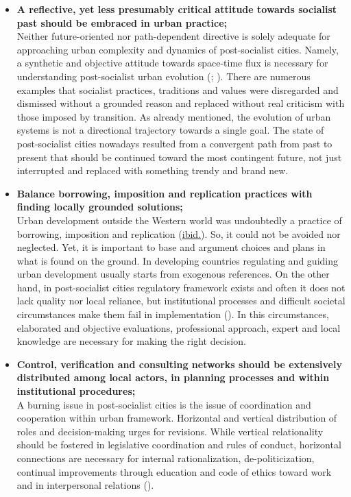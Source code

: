 \documentclass[11pt]{report}
\begin{document}
{\begin{itemize}
\item \textbf{A reflective, yet less presumably critical attitude towards socialist past should be embraced in urban practice;}
\\
Neither future-oriented nor path-dependent directive is solely adequate for approaching urban complexity and dynamics of  post-socialist cities. Namely, a synthetic and objective attitude towards space-time flux is necessary for understanding post-socialist urban evolution (\href{Thomas}{\citealt{thomas_thinking_1998}}; \href{Nedovic}{\citealt{nedovicbudic_waves_2006}}).
There are numerous examples that socialist practices, traditions and values were disregarded and dismissed without a grounded reason and replaced without real criticism with those imposed by transition.
As already mentioned, the evolution of urban systems is not a directional trajectory towards a single goal.
The state of post-socialist cities nowadays resulted from a convergent path from past to present that should be continued toward the most contingent future, not just interrupted and replaced with something trendy and brand  new.

\item \textbf{Balance borrowing, imposition and replication practices with finding locally grounded solutions;}
\\
Urban development outside the Western world was undoubtedly a practice of borrowing, imposition and replication (\href{Nedovic}{ibid.}). So, it could not be avoided nor neglected.
Yet, it is important to base and argument choices and plans in what is found on the ground.
In developing countries regulating and guiding urban development usually starts from exogenous references.
On the other hand,  in post-socialist cities regulatory framework exists and often it does not lack quality nor local reliance, but institutional processes and difficult societal circumstances make them fail in implementation (\href{Nedovic}{\citealt{nedovic-budic_mornings_2011}}). In this circumstances, elaborated and objective evaluations, professional approach, expert and local knowledge are necessary for making the right decision.

\item \textbf{Control, verification and consulting networks should be extensively distributed among local actors, in planning processes and within institutional procedures;}
\\
A burning issue in post-socialist cities is the issue of coordination and cooperation within urban framework.
Horizontal and vertical distribution of roles and decision-making urges for revisions.
While vertical relationality should be fostered in legislative coordination and rules of conduct, horizontal connections are necessary for internal rationalization, de-politicization, continual improvements through education and code of ethics toward work and in interpersonal relations (\href{Vujosevic}{\citealt{vujosevic_regionalizam_2015}}).
     

\end{itemize}}
\end{document}
